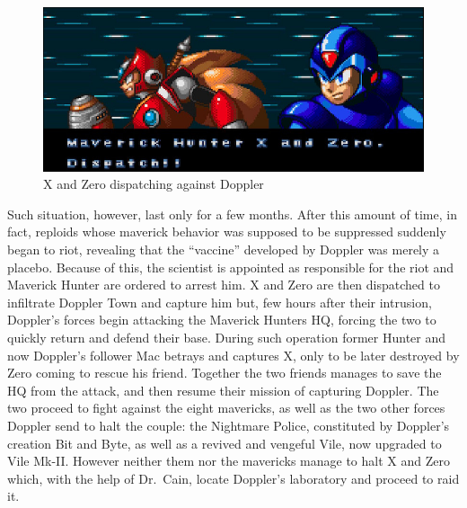 \begin{figure}[htp]
	\centering
	\includegraphics[width=.6\linewidth]{figures/X3/Story_1.jpg}
	\caption{X and Zero dispatching against Doppler}
\end{figure}
Such situation, however, last only for a few months. After this amount of time, in fact, reploids whose maverick behavior was supposed to be suppressed suddenly began to riot, revealing that the ``vaccine'' developed by Doppler was merely a placebo. Because of this, the scientist is appointed as responsible for the riot and Maverick Hunter are ordered to arrest him. X and Zero are then dispatched to infiltrate Doppler Town and capture him but, few hours after their intrusion, Doppler's forces begin attacking the Maverick Hunters HQ, forcing the two to quickly return and defend their base. During such operation former Hunter and now Doppler's follower Mac betrays and captures X, only to be later destroyed by Zero coming to rescue his friend. Together the two friends manages to save the HQ from the attack, and then resume their mission of capturing Doppler. The two proceed to fight against the eight mavericks, as well as the two other forces Doppler send to halt the couple: the Nightmare Police, constituted by Doppler's creation Bit and Byte, as well as a revived and vengeful Vile, now upgraded to Vile Mk-II. However neither them nor the mavericks manage to halt X and Zero which, with the help of Dr.~Cain, locate Doppler's laboratory and proceed to raid it.
